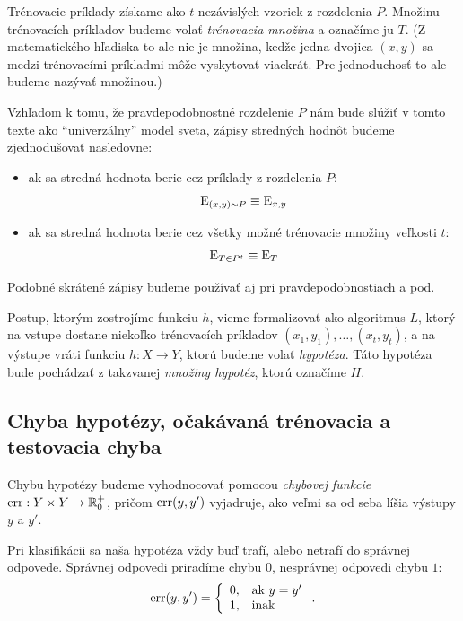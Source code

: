 Trénovacie príklady získame ako $t$ nezávislých vzoriek z rozdelenia $P$.
Množinu trénovacích príkladov budeme volať \emph{trénovacia
množina} a označíme ju $T$. (Z matematického hľadiska to ale nie je
množina, kedže jedna dvojica $(x, y)$ sa medzi
trénovacími príkladmi môže vyskytovať viackrát. Pre jednoduchosť to
ale budeme nazývať množinou.) 

\begin{remark}
Vzhľadom k tomu, že pravdepodobnostné rozdelenie $P$ nám bude slúžiť v tomto
texte ako ``univerzálny'' model sveta, zápisy stredných hodnôt budeme
zjednodušovať nasledovne:

\begin{itemize}
  \item ak sa stredná hodnota berie cez príklady z rozdelenia $P$:
    $$ \mathrm{E}_{(x, y) \sim P} \equiv \mathrm{E}_{x, y} $$
  \item ak sa stredná hodnota berie cez všetky možné trénovacie
    množiny veľkosti $t$:
    $$ \mathrm{E}_{T \in P^t} \equiv \mathrm{E}_T $$
\end{itemize}
Podobné skrátené zápisy budeme používať aj pri pravdepodobnostiach
a pod.
\end{remark}

Postup, ktorým zostrojíme funkciu $h$, vieme formalizovať ako algoritmus $L$,
ktorý na vstupe dostane niekoľko trénovacích príkladov
$(x_1, y_1), \ldots, (x_t, y_t)$, a na výstupe vráti funkciu $h : X \to Y$,
ktorú budeme volať \emph{hypotéza}. Táto hypotéza bude pochádzať z
takzvanej \emph{množiny hypotéz}, ktorú označíme $H$.

\subsection{Chyba hypotézy, očakávaná trénovacia a testovacia chyba}

Chybu hypotézy budeme vyhodnocovať
pomocou \emph{chybovej funkcie} $\mathrm{err} : Y \times Y \to \mathbb{R}^+_0$,
pričom $\mathrm{err}(y, y')$ vyjadruje, ako veľmi
sa od seba líšia výstupy $y$ a $y'$.

Pri klasifikácii sa naša hypotéza vždy buď trafí, alebo netrafí do
správnej odpovede.  Správnej
odpovedi priradíme chybu $0$, nesprávnej odpovedi chybu $1$:
$$
  \mathrm{err}(y, y') = \left\{
    \begin{array}{ll}
      0, & \text{ak}\ y = y' \\
      1, & \text{inak}
    \end{array}
  \right.
  .
$$

